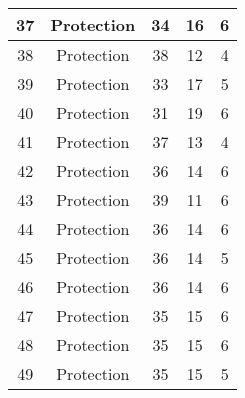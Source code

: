 \documentclass[results.tex]{subfiles}
\begin{document}
\begin{center}
\begin{tabular}{| c || c | c | c | c |}
            \hline
            37                      & Protection                   & 34                     & 16                      & 6                    \\
            \hline
            38                      & Protection                   & 38                     & 12                      & 4                    \\
            \hline
            39                      & Protection                   & 33                     & 17                      & 5                    \\
            \hline
            40                      & Protection                   & 31                     & 19                      & 6                    \\
            \hline
            41                      & Protection                   & 37                     & 13                      & 4                    \\
            \hline
            42                      & Protection                   & 36                     & 14                      & 6                    \\
            \hline
            43                      & Protection                   & 39                     & 11                      & 6                    \\
            \hline
            44                      & Protection                   & 36                     & 14                      & 6                    \\
            \hline
            45                      & Protection                   & 36                     & 14                      & 5                    \\
            \hline
            46                      & Protection                   & 36                     & 14                      & 6                    \\
            \hline
            47                      & Protection                   & 35                     & 15                      & 6                    \\
            \hline
            48                      & Protection                   & 35                     & 15                      & 6                    \\
            \hline
            49                      & Protection                   & 35                     & 15                      & 5                    \\
            \hline
        \end{tabular}
    \end{center}
\end{document}
